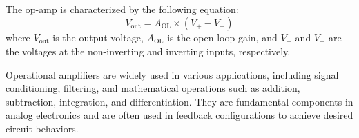 The op-amp is characterized by the following equation:
\[
V_{\text{out}} = A_{\text{OL}} \times (V_+ - V_-)
\]
where \(V_{\text{out}}\) is the output voltage, \(A_{\text{OL}}\) is the open-loop gain, and \(V_+\) and \(V_-\) are the voltages at the non-inverting and inverting inputs, respectively.

Operational amplifiers are widely used in various applications, including signal conditioning, filtering, and mathematical operations such as addition, subtraction, integration, and differentiation. They are fundamental components in analog electronics and are often used in feedback configurations to achieve desired circuit behaviors.

